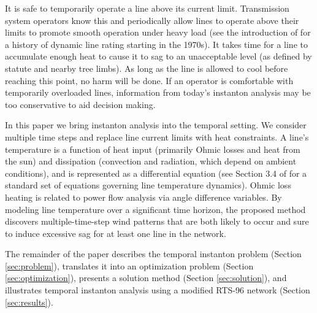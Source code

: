 \documentclass[conference]{IEEEtran}
\begin{document}
It is safe to temporarily operate a line above its current limit. Transmission system operators know this and periodically allow lines to operate above their limits to promote smooth operation under heavy load (see the introduction of \cite{banakar2005} for a history of dynamic line rating starting in the 1970s). It takes time for a line to accumulate enough heat to cause it to sag to an unacceptable level (as defined by statute and nearby tree limbs). As long as the line is allowed to cool before reaching this point, no harm will be done. If an operator is comfortable with temporarily overloaded lines, information from today's instanton analysis may be too conservative to aid decision making.

In this paper we bring instanton analysis into the temporal setting. We consider multiple time steps and replace line current limits with heat constraints. A line's temperature is a function of heat input (primarily Ohmic losses and heat from the sun) and dissipation (convection and radiation, which depend on ambient conditions), and is represented as a differential equation (see Section 3.4 of \cite{ieee2007} for a standard set of equations governing line temperature dynamics). Ohmic loss heating is related to power flow analysis via angle difference variables. By modeling line temperature over a significant time horizon, the proposed method discovers multiple-time-step wind patterns that are both likely to occur and sure to induce excessive sag for at least one line in the network.

The remainder of the paper describes the temporal instanton problem (Section \ref{sec:problem}), translates it into an optimization problem (Section \ref{sec:optimization}), presents a solution method (Section \ref{sec:solution}), and illustrates temporal instanton analysis using a modified RTS-96 network (Section \ref{sec:results}).
\end{document}
